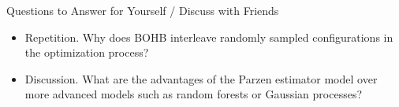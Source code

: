 \begin{frame}{Questions to Answer for Yourself / Discuss with Friends}

\bigskip

\begin{itemize}
    \item \alert{Repetition.} Why does BOHB interleave randomly sampled configurations in the optimization process?

\medskip
    \item \alert{Discussion.} 
    What are the advantages of the Parzen estimator model over more advanced models such as random forests or Gaussian processes?

\end{itemize}

\end{frame}


